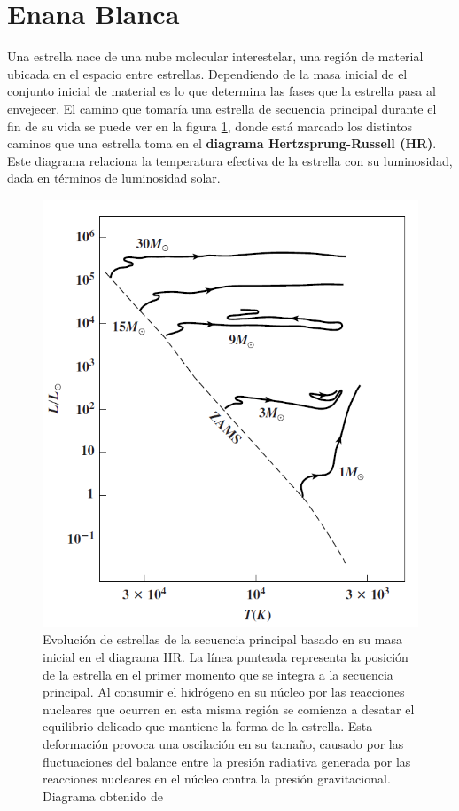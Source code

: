 \section{Enana Blanca}\label{intro:sec:EnanaBlanca}

Una estrella nace de una nube molecular interestelar, una región de material
ubicada en el espacio entre estrellas. Dependiendo de la masa inicial de el
conjunto inicial de material es lo que determina las fases que la estrella pasa
al envejecer. El camino que tomaría una estrella de secuencia principal durante
el fin de su vida se puede ver en la figura \ref{evolucionMSEstrella}, donde
está marcado los distintos caminos que una estrella toma en el \textbf{diagrama
Hertzsprung-Russell (HR)}. Este diagrama relaciona la temperatura efectiva de la
estrella con su luminosidad, dada en términos de luminosidad solar.

\begin{figure}[!ht]
	\centering
	\includegraphics[scale=0.5]{Introduccion/Figures/Figura Evolucion_MS_Astronomy_Physical_Perspective.png}
	\caption{Evolución de estrellas de la secuencia principal basado en su masa
	inicial en el diagrama HR. La línea punteada representa la posición de la
	estrella en el primer momento que se integra a la secuencia principal. Al
	consumir el hidrógeno en su núcleo por las reacciones nucleares que ocurren
	en esta misma región se comienza a desatar el equilibrio delicado que
	mantiene la forma de la estrella. Esta deformación provoca una oscilación en
	su tamaño, causado por las fluctuaciones del balance entre la presión
	radiativa generada por las reacciones nucleares en el núcleo contra la
	presión gravitacional. Diagrama obtenido de \citet{astronomyPhysicalPerspective_stellarOldAgeChapter}}
	\label{evolucionMSEstrella}
\end{figure}

